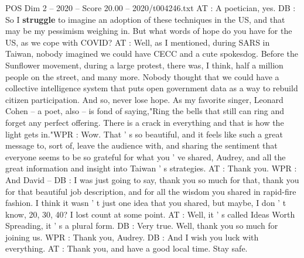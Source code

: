 \begin{textsample}{POS Dim 2 – 2020 – Score 20.00 – 2020/t004246.txt}
AT : A poetician, yes.
DB : So I \textbf{struggle} to imagine an adoption of these techniques in the US, and that may be my pessimism weighing in.
But what words of hope do you have for the US, as we cope with COVID?
AT : Well, as I mentioned, during SARS in Taiwan, nobody imagined we could have CECC and a cute spokesdog.
Before the Sunflower movement, during a large protest, there was, I think, half a million people on the street, and many more.
Nobody thought that we could have a collective intelligence system that puts open government data as a way to rebuild citizen participation.
And so, never lose hope.
As my favorite singer, Leonard Cohen -- a poet, also -- is fond of saying,"Ring the bells that still can ring and forget any perfect offering.
There is a crack in everything and that is how the light gets in."WPR : Wow.
That ' s so beautiful, and it feels like such a great message to, sort of, leave the audience with, and sharing the sentiment that everyone seems to be so grateful for what you ' ve shared, Audrey, and all the great information and insight into Taiwan ' s strategies.
AT : Thank you.
WPR : And David -- DB : I was just going to say, thank you so much for that, thank you for that beautiful job description, and for all the wisdom you shared in rapid-fire fashion.
I think it wasn ' t just one idea that you shared, but maybe, I don ' t know, 20, 30, 40?
I lost count at some point.
AT : Well, it ' s called Ideas Worth Spreading, it ' s a plural form.
DB : Very true.
Well, thank you so much for joining us.
WPR : Thank you, Audrey.
DB : And I wish you luck with everything.
AT : Thank you, and have a good local time.
Stay safe.

\end{textsample}
